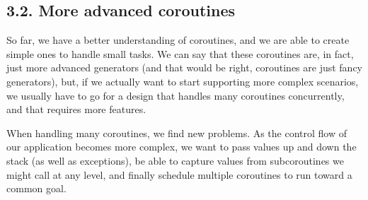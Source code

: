 \documentclass[a4paper,10pt,english]{sphinxmanual}
\begin{document}
\begin{sphinxVerbatim}[commandchars=\\\{\}]
 
      
      
         
                 
              
     

   
 
\end{sphinxVerbatim}


\subsection{3.2. More advanced coroutines}
\label{\detokenize{chapters/7_generators/index:more-advanced-coroutines}}
So far, we have a better understanding of coroutines, and we are able to create simple ones
to handle small tasks. We can say that these coroutines are, in fact, just more advanced
generators (and that would be right, coroutines are just fancy generators), but, if we
actually want to start supporting more complex scenarios, we usually have to go for a
design that handles many coroutines concurrently, and that requires more features.

When handling many coroutines, we find new problems. As the control flow of our
application becomes more complex, we want to pass values up and down the stack (as well
as exceptions), be able to capture values from sub\sphinxhyphen{}coroutines we might call at any level, and
finally schedule multiple coroutines to run toward a common goal.
\end{document}

